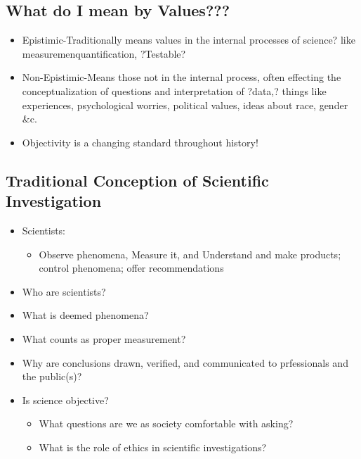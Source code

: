 \documentclass[11pt]{article}
\begin{document}
\subsection{What do I mean by Values???}
\label{sec-2-1}

\begin{itemize}
\item Epistimic-Traditionally means values in the internal processes of science? like measuremenquantification, ?Testable?

\item Non-Epistimic-Means those not in the internal process, often effecting the conceptualization of questions and interpretation of ?data,? things like experiences, psychological worries, political values, ideas about race, gender \&c.

\item Objectivity is a changing standard throughout history!
\end{itemize}


\subsection{Traditional Conception of Scientific Investigation}
\label{sec-2-2}
\begin{itemize}
\item Scientists:

\begin{itemize}
\item Observe phenomena, Measure it, and Understand and make products; control phenomena; offer recommendations
\end{itemize}

\item Who are scientists?

\item What is deemed phenomena?

\item What counts as proper measurement?

\item Why are conclusions drawn, verified, and communicated to prfessionals and the public(s)?

\item Is science objective? 

\begin{itemize}
\item What questions are we as society comfortable with asking?

\item What is the role of ethics in scientific investigations?
\end{itemize}
\end{itemize}
\end{document}
